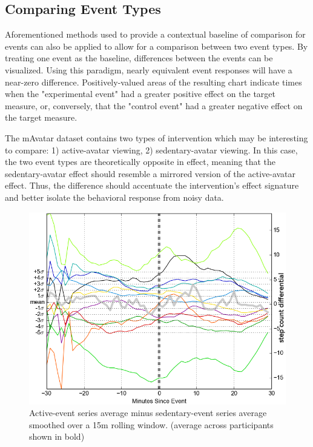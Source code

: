 
\subsection{Comparing Event Types}
Aforementioned methods used to provide a contextual baseline of comparison for events can also be applied to allow for a comparison between two event types.
By treating one event as the baseline, differences between the events can be visualized.
Using this paradigm, nearly equivalent event responses will have a near-zero difference.
Positively-valued areas of the resulting chart indicate times when the "experimental event" had a greater positive effect on the target measure, or, conversely, that the "control event" had a greater negative effect on the target measure.


The mAvatar dataset contains two types of intervention which may be interesting to compare: 1) active-avatar viewing, 2) sedentary-avatar viewing.
In this case, the two event types are theoretically opposite in effect, meaning that the sedentary-avatar effect should resemble a mirrored version of the active-avatar effect.
Thus, the difference should accentuate the intervention's effect signature and better isolate the behavioral response from noisy data.

\begin{figure}
\centering
\includegraphics[width=0.9\columnwidth]{./img/mAvatar_difference_events_smooth15m.png}
\caption{Active-event series average minus sedentary-event series average smoothed over a 15m rolling window. (average across participants shown in bold)}
\label{fig:mAvatarDifference}
\end{figure}

